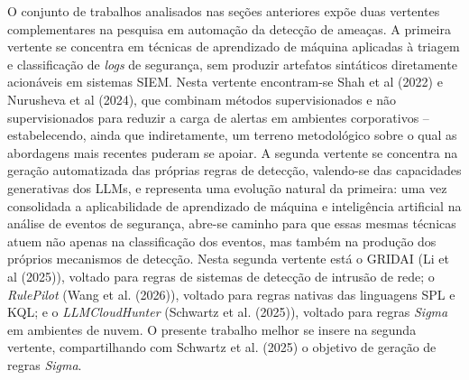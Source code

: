 O conjunto de trabalhos analisados nas seções anteriores expõe duas vertentes complementares na pesquisa em automação da detecção de ameaças. 
A primeira vertente se concentra em técnicas de aprendizado de máquina aplicadas à triagem e classificação de \textit{logs} de segurança, sem produzir artefatos sintáticos diretamente acionáveis em sistemas \gls{SIEM}. 
Nesta vertente encontram-se Shah et al (2022) e Nurusheva et al (2024), que combinam métodos supervisionados e não supervisionados para reduzir a carga de alertas em ambientes corporativos -- estabelecendo, ainda que indiretamente, um terreno metodológico sobre o qual as abordagens mais recentes puderam se apoiar. 
A segunda vertente se concentra na geração automatizada das próprias regras de detecção, valendo-se das capacidades generativas dos LLMs, e representa uma evolução natural da primeira: 
uma vez consolidada a aplicabilidade de aprendizado de máquina e inteligência artificial na análise de eventos de segurança, abre-se caminho para que essas mesmas técnicas atuem não apenas na classificação dos eventos, mas também na produção dos próprios mecanismos de detecção. 
Nesta segunda vertente está o GRIDAI (Li et al (2025)), voltado para regras de sistemas de detecção de intrusão de rede; o \textit{RulePilot} (Wang et al. (2026)), voltado para regras nativas das linguagens SPL e KQL; e o \textit{LLMCloudHunter} (Schwartz et al. (2025)), voltado para regras \textit{Sigma} em ambientes de nuvem. 
O presente trabalho melhor se insere na segunda vertente, compartilhando com Schwartz et al. (2025) o objetivo de geração de regras \textit{Sigma}.

